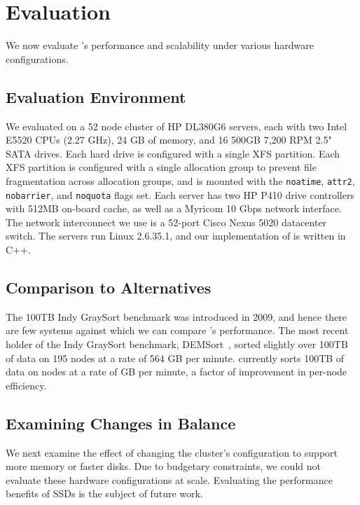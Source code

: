 \section{Evaluation}
\label{sec:evaluation}

We now evaluate \tritonsort's performance and scalability under
various hardware configurations.

\subsection{Evaluation Environment}

We evaluated \tritonsort on a 52 node cluster of HP DL380G6 servers, each with
two Intel E5520 CPUs (2.27 GHz), 24 GB of memory, and 16 500GB 7,200 RPM 2.5"
SATA drives.  Each hard drive is configured with a single XFS partition.  Each
XFS partition is configured with a single allocation group to prevent file
fragmentation across allocation groups, and is mounted with the
\texttt{noatime}, \texttt{attr2}, \texttt{nobarrier}, and \texttt{noquota}
flags set.  Each server has two HP P410 drive controllers with 512MB on-board
cache, as well as a Myricom 10 Gbps network interface.  The network
interconnect we use is a 52-port Cisco Nexus 5020 datacenter switch.  The
servers run Linux 2.6.35.1, and our implementation of \tritonsort is written in
C++.

\subsection{Comparison to Alternatives}

The 100TB Indy GraySort benchmark was introduced in 2009, and hence there are
few systems against which we can compare \tritonsort's performance. The most
recent holder of the Indy GraySort benchmark, DEMSort~\cite{DEMSort}, sorted
slightly over 100TB of data on 195 nodes at a rate of 564 GB per minute.
\tritonsort currently sorts 100TB of data on \tsnodes nodes at a rate of
\tsrate GB per minute, a factor of \tsimprovementfactor improvement in per-node
efficiency.

\subsection{Examining Changes in Balance}

We next examine the effect of changing the cluster's configuration to support
more memory or faster disks. Due to budgetary constraints, we could not
evaluate these hardware configurations at scale. Evaluating
the performance benefits of SSDs is the subject of future work.

